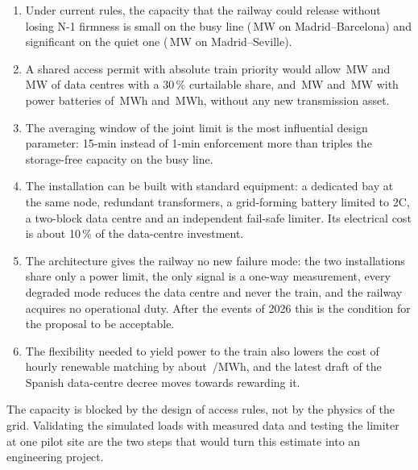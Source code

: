 \begin{enumerate}
\item Under current rules, the capacity that the railway could release without losing N-1 firmness is small on the busy line (\mzbFirm\,MW on Madrid--Barcelona) and significant on the quiet one (\msFirm\,MW on Madrid--Seville).
\item A shared access permit with absolute train priority would allow \mzbFlex\,MW and \msFlex\,MW of data centres with a 30\,\% curtailable share, and \mzbBat\,MW and \msBat\,MW with power batteries of \mzbBatMWh\,MWh and \msBatMWh\,MWh, without any new transmission asset.
\item The averaging window of the joint limit is the most influential design parameter: 15-min instead of 1-min enforcement more than triples the storage-free capacity on the busy line.
\item The installation can be built with standard equipment: a dedicated bay at the same node, redundant transformers, a grid-forming battery limited to 2C, a two-block data centre and an independent fail-safe limiter. Its electrical cost is about 10\,\% of the data-centre investment.
\item The architecture gives the railway no new failure mode: the two installations share only a power limit, the only signal is a one-way measurement, every degraded mode reduces the data centre and never the train, and the railway acquires no operational duty. After the events of 2026 this is the condition for the proposal to be acceptable.
\item The flexibility needed to yield power to the train also lowers the cost of hourly renewable matching by about \resFlexValue\,\texteuro/MWh, and the latest draft of the Spanish data-centre decree moves towards rewarding it.
\end{enumerate}

The capacity is blocked by the design of access rules, not by the physics of the grid. Validating the simulated loads with measured data and testing the limiter at one pilot site are the two steps that would turn this estimate into an engineering project.
